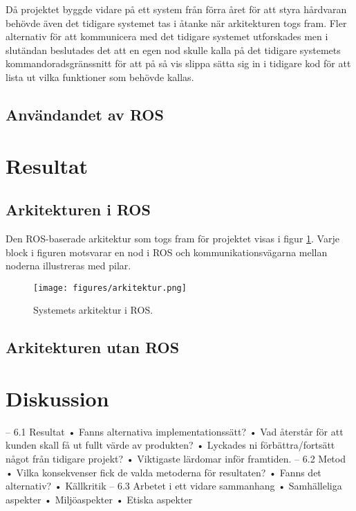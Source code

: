 Då projektet byggde vidare på ett system från förra året för att styra hårdvaran behövde även det tidigare systemet tas i åtanke när arkitekturen togs fram. Fler alternativ för att kommunicera med det tidigare systemet utforskades men i slutändan beslutades det att en egen nod skulle kalla på det tidigare systemets kommandoradsgränssnitt för att på så vis slippa sätta sig in i tidigare kod för att lista ut vilka funktioner som behövde kallas.

\subsection{Användandet av ROS}


\section{Resultat}
\label{sec:results-lundberg}

\subsection{Arkitekturen i ROS}
Den ROS-baserade arkitektur som togs fram för projektet visas i figur \ref{fig:arkitektur}. Varje block i figuren motsvarar en nod i ROS och kommunikationsvägarna mellan noderna illustreras med pilar.

\begin{figure}[h]
	\centering
	\texttt{[image: figures/arkitektur.png]}
	\caption{Systemets arkitektur i ROS.}
	\label{fig:arkitektur}
\end{figure}

\subsection{Arkitekturen utan ROS}



\section{Diskussion}
\label{sec:discussion-lundberg}

– 6.1 Resultat
• Fanns alternativa implementationssätt?
• Vad återstår för att kunden skall få ut fullt värde av
produkten?
• Lyckades ni förbättra/fortsätt något från tidigare projekt?
• Viktigaste lärdomar inför framtiden.
– 6.2 Metod
• Vilka konsekvenser fick de valda metoderna för resultaten?
• Fanns det alternativ?
• Källkritik
– 6.3 Arbetet i ett vidare sammanhang
• Samhälleliga aspekter
• Miljöaspekter
• Etiska aspekter

